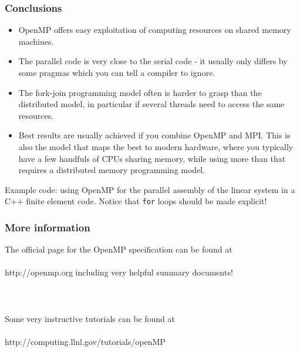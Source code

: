 \begin{frame}
  \frametitle{Conclusions}
  \begin{itemize}
  \item OpenMP offers easy exploitation of computing resources on shared memory
    machines.
  \item The parallel code is very close to the serial code - it usually only
    differs by some pragmas which you can tell a compiler to ignore.
  \item The fork-join programming model often is harder to grasp than the
    distributed model, in particular if several threads need to access the same
    resources.
  \item Best results are usually achieved if you combine OpenMP and MPI. This is
    also the model that maps the best to modern hardware, where you typically
    have a few handfuls of CPUs sharing memory, while using more than that
    requires a distributed memory programming model.
  \end{itemize}

Example code: using OpenMP for the parallel assembly of the linear system in a C++ finite element code. Notice that \texttt{for} loops should be made explicit!
\end{frame}

\begin{frame}
  \frametitle{More information}
  \begin{center}
    The official page for the OpenMP specification can be found at \\~\\
    http://openmp.org including very helpful summary documents!\\~\\~\\~\\
    Some very instructive tutorials can be found at \\~\\
    http://computing.llnl.gov/tutorials/openMP
  \end{center}
\end{frame}



